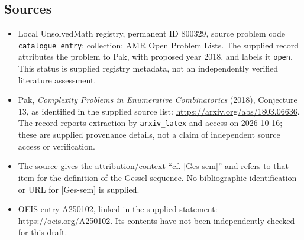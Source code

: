 \documentclass[11pt]{article}
\begin{document}
\subsection{Sources}
\begin{itemize}
\item Local UnsolvedMath registry, permanent ID \(800329\), source problem code \texttt{catalogue entry}; collection: AMR Open Problem Lists. The supplied record attributes the problem to Pak, with proposed year 2018, and labels it \texttt{open}. This status is supplied registry metadata, not an independently verified literature assessment.
\item Pak, \emph{Complexity Problems in Enumerative Combinatorics} (2018), Conjecture 13, as identified in the supplied source list: \url{https://arxiv.org/abs/1803.06636}. The record reports extraction by \texttt{arxiv\_latex} and access on 2026-10-16; these are supplied provenance details, not a claim of independent source access or verification.
\item The source gives the attribution/context ``cf. [Ges-sem]'' and refers to that item for the definition of the Gessel sequence. No bibliographic identification or URL for [Ges-sem] is supplied.
\item OEIS entry A250102, linked in the supplied statement: \url{https://oeis.org/A250102}. Its contents have not been independently checked for this draft.
\end{itemize}
\end{document}
